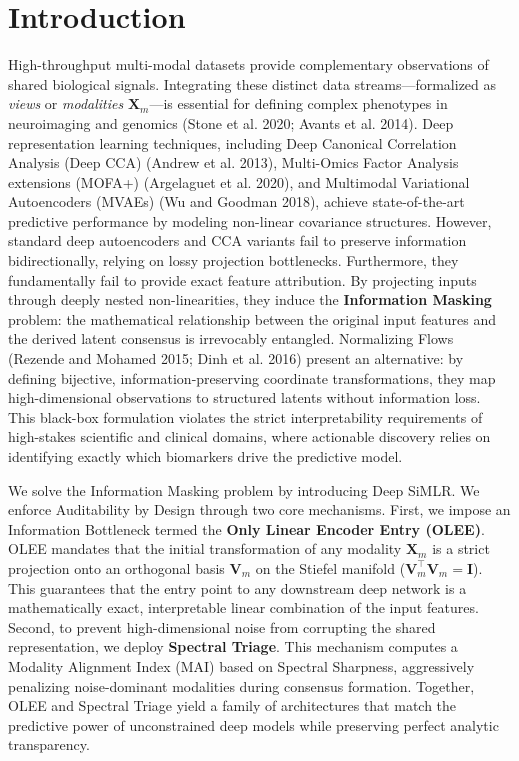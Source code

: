 \documentclass[
  letterpaper,
]{report}
\begin{document}
\section{Introduction}\label{introduction}

High-throughput multi-modal datasets provide complementary observations
of shared biological signals. Integrating these distinct data
streams---formalized as \emph{views} or \emph{modalities}
\(\mathbf{X}_m\)---is essential for defining complex phenotypes in
neuroimaging and genomics ({Stone et al.} 2020; Avants et al. 2014).
Deep representation learning techniques, including Deep Canonical
Correlation Analysis (Deep CCA) (Andrew et al. 2013), Multi-Omics Factor
Analysis extensions (MOFA+) (Argelaguet et al. 2020), and Multimodal
Variational Autoencoders (MVAEs) (Wu and Goodman 2018), achieve
state-of-the-art predictive performance by modeling non-linear
covariance structures. However, standard deep autoencoders and CCA
variants fail to preserve information bidirectionally, relying on lossy
projection bottlenecks. Furthermore, they fundamentally fail to provide
exact feature attribution. By projecting inputs through deeply nested
non-linearities, they induce the \textbf{Information Masking} problem:
the mathematical relationship between the original input features and
the derived latent consensus is irrevocably entangled. Normalizing Flows
(Rezende and Mohamed 2015; Dinh et al. 2016) present an alternative: by
defining bijective, information-preserving coordinate transformations,
they map high-dimensional observations to structured latents without
information loss. This black-box formulation violates the strict
interpretability requirements of high-stakes scientific and clinical
domains, where actionable discovery relies on identifying exactly which
biomarkers drive the predictive model.

We solve the Information Masking problem by introducing Deep SiMLR. We
enforce Auditability by Design through two core mechanisms. First, we
impose an Information Bottleneck termed the \textbf{Only Linear Encoder
Entry (OLEE)}. OLEE mandates that the initial transformation of any
modality \(\mathbf{X}_m\) is a strict projection onto an orthogonal
basis \(\mathbf{V}_m\) on the Stiefel manifold
(\(\mathbf{V}_m^\top \mathbf{V}_m = \mathbf{I}\)). This guarantees that
the entry point to any downstream deep network is a mathematically
exact, interpretable linear combination of the input features. Second,
to prevent high-dimensional noise from corrupting the shared
representation, we deploy \textbf{Spectral Triage}. This mechanism
computes a Modality Alignment Index (MAI) based on Spectral Sharpness,
aggressively penalizing noise-dominant modalities during consensus
formation. Together, OLEE and Spectral Triage yield a family of
architectures that match the predictive power of unconstrained deep
models while preserving perfect analytic transparency.
\end{document}
